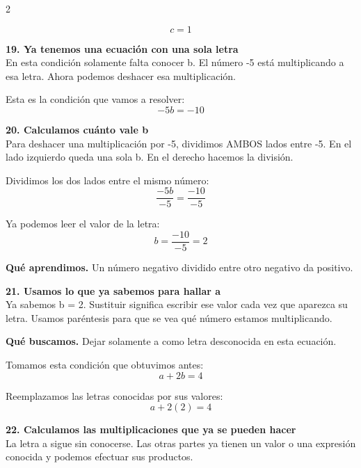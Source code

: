 \documentclass[11pt,a4paper,landscape]{article}
\begin{document}
\begin{multicols*}{2}
\begin{minipage}{\linewidth}
\[c=1\]
\end{minipage}\par\medskip
\noindent\begin{minipage}{\linewidth}\textbf{19. Ya tenemos una ecuación con una sola letra}\\[2pt]En esta condición solamente falta conocer b. El número -5 está multiplicando a esa letra. Ahora podemos deshacer esa multiplicación.
\par\smallskip Esta es la condición que vamos a resolver:
\[-5b = -10\]
\end{minipage}\par\medskip
\noindent\begin{minipage}{\linewidth}\textbf{20. Calculamos cuánto vale b}\\[2pt]Para deshacer una multiplicación por -5, dividimos AMBOS lados entre -5. En el lado izquierdo queda una sola b. En el derecho hacemos la división.
\par\smallskip Dividimos los dos lados entre el mismo número:
\[\frac{-5b}{-5}=\frac{-10}{-5}\]
\par\smallskip Ya podemos leer el valor de la letra:
\[b=\frac{-10}{-5}=2\]
\par\smallskip\textbf{Qué aprendimos.} Un número negativo dividido entre otro negativo da positivo.
\end{minipage}\par\medskip
\noindent\begin{minipage}{\linewidth}\textbf{21. Usamos lo que ya sabemos para hallar a}\\[2pt]Ya sabemos b = 2. Sustituir significa escribir ese valor cada vez que aparezca su letra. Usamos paréntesis para que se vea qué número estamos multiplicando.
\par\smallskip\textbf{Qué buscamos.} Dejar solamente a como letra desconocida en esta ecuación.
\par\smallskip Tomamos esta condición que obtuvimos antes:
\[a + 2b = 4\]
\par\smallskip Reemplazamos las letras conocidas por sus valores:
\[a + 2\left(2\right)=4\]
\end{minipage}\par\medskip
\noindent\begin{minipage}{\linewidth}\textbf{22. Calculamos las multiplicaciones que ya se pueden hacer}\\[2pt]La letra a sigue sin conocerse. Las otras partes ya tienen un valor o una expresión conocida y podemos efectuar sus productos.
\par{}\par\smallskip

\end{minipage}
\end{multicols*}
\end{document}

